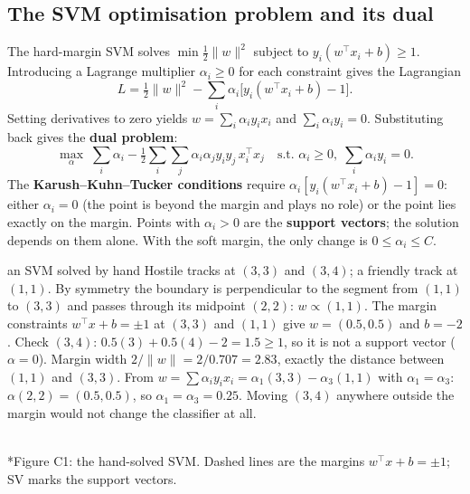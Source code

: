 \documentclass[11pt]{article}
\begin{document}
\subsection{The SVM optimisation problem and its dual}
The hard-margin SVM solves $\min\frac12\|w\|^2$ subject to $y_i(w^\top x_i+b)\ge1$. Introducing a Lagrange multiplier $\alpha_i\ge0$ for each constraint gives the Lagrangian
\[L=\tfrac12\|w\|^2-\textstyle\sum_i\alpha_i\big[y_i(w^\top x_i+b)-1\big].\]
Setting derivatives to zero yields $w=\sum_i\alpha_iy_ix_i$ and $\sum_i\alpha_iy_i=0$. Substituting back gives the \textbf{dual problem}:
\[\max_\alpha\;\sum_i\alpha_i-\tfrac12\sum_i\sum_j\alpha_i\alpha_jy_iy_j\,x_i^\top x_j\quad\text{s.t. }\alpha_i\ge0,\;\textstyle\sum_i\alpha_iy_i=0.\]
The \textbf{Karush--Kuhn--Tucker conditions} require $\alpha_i[y_i(w^\top x_i+b)-1]=0$: either $\alpha_i=0$ (the point is beyond the margin and plays no role) or the point lies exactly on the margin. Points with $\alpha_i>0$ are the \textbf{support vectors}; the solution depends on them alone. With the soft margin, the only change is $0\le\alpha_i\le C$.
\begin{example}{an SVM solved by hand}
Hostile tracks at $(3,3)$ and $(3,4)$; a friendly track at $(1,1)$. By symmetry the boundary is perpendicular to the segment from $(1,1)$ to $(3,3)$ and passes through its midpoint $(2,2)$: $w\propto(1,1)$. The margin constraints $w^\top x+b=\pm1$ at $(3,3)$ and $(1,1)$ give $w=(0.5,0.5)$ and $b=-2$. Check $(3,4)$: $0.5(3)+0.5(4)-2=1.5\ge1$, so it is not a support vector ($\alpha=0$). Margin width $2/\|w\|=2/0.707=2.83$, exactly the distance between $(1,1)$ and $(3,3)$. From $w=\sum\alpha_iy_ix_i=\alpha_1(3,3)-\alpha_3(1,1)$ with $\alpha_1=\alpha_3$: $\alpha(2,2)=(0.5,0.5)$, so $\alpha_1=\alpha_3=0.25$. Moving $(3,4)$ anywhere outside the margin would not change the classifier at all.
\end{example}
\begin{center}\\*{\small\color{GreyN}Figure C1: the hand-solved SVM. Dashed lines are the margins $w^\top x+b=\pm1$; SV marks the support vectors.}\end{center}
\end{document}
